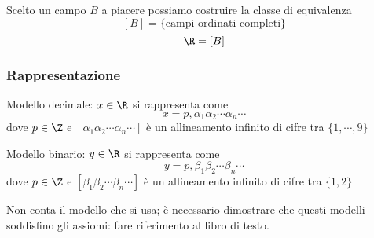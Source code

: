 
Scelto un campo $ B $ a piacere possiamo costruire la classe di equivalenza \[
    [B]=\{\text{campi ordinati completi}\}
\]
\[
    \R=[B]
\]

\subsubsection{Rappresentazione}
Modello decimale: $ x \in \R $  si rappresenta come \[
    x=p,\alpha_1\alpha_2\cdots\alpha_{n}\cdots 
\]
dove $ p \in \Z $ e $ [\alpha_1\alpha_2\cdots\alpha_{n}\cdots ] $ è un allineamento infinito di cifre tra $ \{1, \cdots, 9\} $

Modello binario: $ y \in \R $ si rappresenta come \[
    y=p,\beta_1 \beta_2\cdots\beta_{n}\cdots
\]
dove $ p \in \Z $ e $ [\beta_1 \beta_2\cdots\beta_{n}\cdots ] $ è un allineamento infinito di cifre tra $ \{1, 2\} $

Non conta il modello che si usa; è necessario dimostrare che questi modelli soddisfino gli assiomi: fare riferimento al libro di testo.